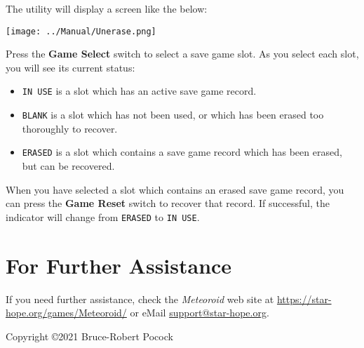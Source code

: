 \documentclass[article]{memoir}
\begin{document}
The utility will display a screen like the below:

\texttt{[image: ../Manual/Unerase.png]}

Press the \textbf{Game Select} switch to select a save game slot. As you
select each slot, you will see its current status:

\begin{itemize}
\item \texttt{IN USE} is a slot which has an active save game record.
\item \texttt{BLANK}  is a slot  which has not  been used, or  which has
  been erased too thoroughly to recover.
\item \texttt{ERASED} is a slot which  contains a save game record which
  has been erased, but can be recovered.
\end{itemize}

When you have selected a slot which contains an erased save game record,
you can  press the  \textbf{Game Reset} switch  to recover  that record.
If  successful,  the  indicator  will  change  from  \texttt{ERASED}  to
\texttt{IN USE}.

\section*{For Further Assistance}

If you need further assistance, check the \textit{Meteoroid} web site at
\href{https://star-hope.org/games/Meteoroid/}{https://\-star-hope.org/\-games/\-Meteoroid/}
or eMail \href{mailto:support@star-hope.org}{support@star-hope.org}.

\vfill

Copyright \copyright 2021 Bruce-Robert Pocock
\end{document}
